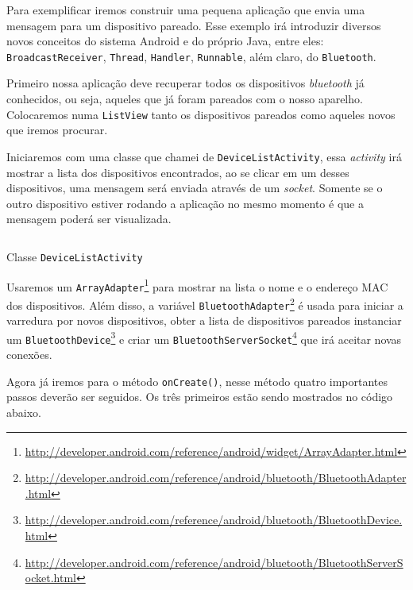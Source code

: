 \documentclass[a4paper,12pt,brazil,oneside]{book}
\begin{document}
\begin{singlespace}
	Para exemplificar iremos construir uma pequena aplicação que envia uma mensagem para um dispositivo pareado. Esse exemplo irá introduzir diversos novos conceitos do sistema Android e do próprio Java, entre eles: \texttt{BroadcastReceiver}, \texttt{Thread}, \texttt{Handler}, \texttt{Runnable}, além claro, do \texttt{Bluetooth}.
 
	 Primeiro nossa aplicação deve recuperar todos os dispositivos \emph{bluetooth} já conhecidos, ou seja, aqueles que já foram pareados com o nosso aparelho. Colocaremos numa \texttt{ListView} tanto os dispositivos pareados como aqueles novos que iremos procurar. 

	Iniciaremos com uma classe que chamei de \texttt{DeviceListActivity}, essa \emph{activity} irá mostrar a lista dos dispositivos encontrados, ao se clicar em um desses dispositivos, uma mensagem será enviada através de um \emph{socket}. Somente se o outro dispositivo estiver rodando a aplicação no mesmo momento é que a mensagem poderá ser visualizada.

	\begin{listing}[H]
	\inputminted[linenos=true,fontsize=\small,frame=lines, framesep=2mm, tabsize=2,numbersep=5pt]{java}{src/api/bluetooth/activity.java}
	\caption{Classe \texttt{DeviceListActivity}}
	\label{code:bluetooth-activity}
	\end{listing} 			

	Usaremos um \texttt{ArrayAdapter}\footnote{\href{http://developer.android.com/reference/android/widget/ArrayAdapter.html}{http://developer.android.com/reference/android/widget/ArrayAdapter.html}} para mostrar na lista o nome e o endereço MAC dos dispositivos. Além disso, a variável \texttt{BluetoothAdapter}\footnote{\href{http://developer.android.com/reference/android/bluetooth/BluetoothAdapter.html}{http://developer.android.com/reference/android/bluetooth/BluetoothAdapter.html}} é usada para iniciar a varredura por novos dispositivos, obter a lista de dispositivos pareados instanciar um \texttt{BluetoothDevice}\footnote{\href{http://developer.android.com/reference/android/bluetooth/BluetoothDevice.html}{http://developer.android.com/reference/android/bluetooth/BluetoothDevice.html}} e criar um \texttt{BluetoothServerSocket}\footnote{\href{http://developer.android.com/reference/android/bluetooth/BluetoothServerSocket.html}{http://developer.android.com/reference/android/bluetooth/BluetoothServerSocket.html}} que irá aceitar novas conexões. 

	Agora já iremos para o método \texttt{onCreate()}, nesse método quatro importantes passos deverão ser seguidos. Os três primeiros estão sendo mostrados no código abaixo.


\end{singlespace}
\end{document}
